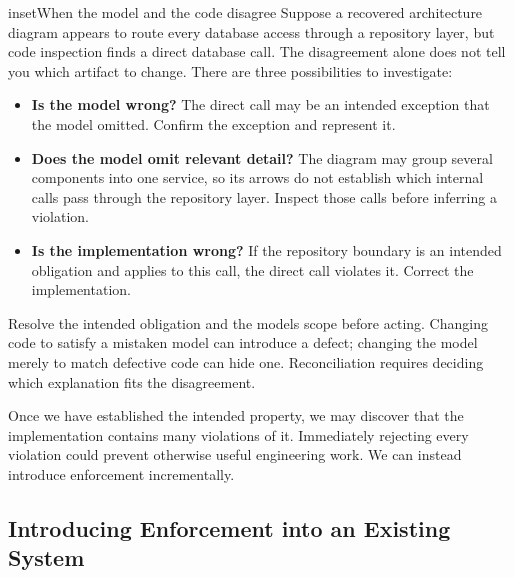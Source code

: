 


\begin{bookbox}{inset}{When the model and the code disagree}
\label{inset-model-code-disagreement}
Suppose a recovered architecture diagram appears to route every database access through a repository layer, but code inspection finds a direct database call. The disagreement alone does not tell you which artifact to change. There are three possibilities to investigate:

\begin{itemize}
\tightlist
\item
  \textbf{Is the model wrong?} The direct call may be an intended exception that the model omitted. Confirm the exception and represent it.
\item
  \textbf{Does the model omit relevant detail?} The diagram may group several components into one service, so its arrows do not establish which internal calls pass through the repository layer. Inspect those calls before inferring a violation.
\item
  \textbf{Is the implementation wrong?} If the repository boundary is an intended obligation and applies to this call, the direct call violates it. Correct the implementation.
\end{itemize}

Resolve the intended obligation and the model\textquotesingle s scope before acting. Changing code to satisfy a mistaken model can introduce a defect; changing the model merely to match defective code can hide one. Reconciliation requires deciding which explanation fits the disagreement.
\end{bookbox}

Once we have established the intended property, we may discover that the implementation contains many violations of it. Immediately rejecting every violation could prevent otherwise useful engineering work. We can instead introduce enforcement incrementally.


\subsection{Introducing Enforcement into an Existing System}\label{heading:audit-drain-promote-move}

